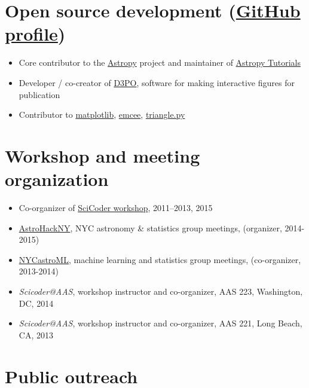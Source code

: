 \documentclass[12pt,letterpaper]{article}
\begin{document}
\section*{Open source development (\href{https://github.com/adrn}{GitHub profile})}

\begin{itemize}

	\item Core contributor to the \href{http://www.astropy.org/}{Astropy} project and maintainer of \href{http://tutorials.astropy.org/}{Astropy Tutorials}
	\item Developer / co-creator of \href{http://d3po.org}{D3PO}, software for making interactive figures for publication
	\item Contributor to \href{http://matplotlib.org/}{matplotlib}, \href{http://dan.iel.fm/emcee/current/}{emcee}, \href{https://github.com/dfm/triangle.py}{triangle.py}

\end{itemize}


\section*{Workshop and meeting organization}

\begin{itemize}
	\item Co-organizer of \href{http://scicoder.org}{SciCoder workshop}, 2011--2013, 2015
	\item \href{https://groups.google.com/forum/#!forum/astrohackny}{AstroHackNY}, NYC astronomy \& statistics group meetings, (organizer, 2014-2015)
	\item \href{https://github.com/adrn/nycastroml}{NYCastroML}, machine learning and statistics group meetings, (co-organizer, 2013-2014)
	\item \emph{Scicoder@AAS}, workshop instructor and co-organizer, AAS 223, Washington, DC, 2014
	\item \emph{Scicoder@AAS}, workshop instructor and co-organizer, AAS 221, Long Beach, CA, 2013
\end{itemize}


\section*{Public outreach}
\end{document}
